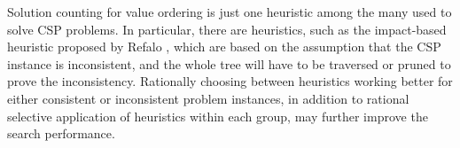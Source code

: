 Solution counting for value ordering is just one heuristic among the
many used to solve CSP problems. In particular, there are
heuristics, such as the impact-based heuristic proposed by
Refalo \cite{Refalo.impact}, which are based on the assumption that
the CSP instance is inconsistent, and the whole tree will have to be
traversed or pruned to prove the inconsistency. Rationally choosing between
heuristics working better for either consistent or inconsistent
problem instances, in addition to rational selective application of
heuristics within each group, may further improve the search
performance. 
